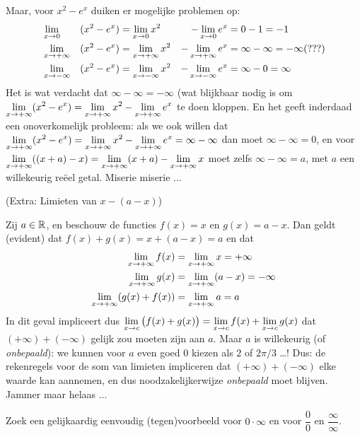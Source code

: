 \documentclass{ximera}
\begin{document}
\begin{example}
	Maar, voor $x^2 - e^x$ duiken er mogelijke problemen op:
	\begin{alignat*}{6}
		& \limx &(x^2-e^x)   & = \limx x^2   &- \limx e^x   & = 0 - 1 = -1 \\
		& \limxi &(x^2-e^x)  & = \limxi x^2  &- \limxi e^x  & = \infty - \infty = -\infty (???) \\
		& \limxmi &(x^2-e^x) & = \limxmi x^2 &- \limxmi e^x & = \infty - 0 = \infty \\
	\end{alignat*}
	Het is wat verdacht dat $\infty - \infty = -\infty$ (wat blijkbaar nodig is om $\limxi (x^2-e^x) = \limxi x^2  - \limxi e^x$ te doen kloppen.  En het geeft inderdaad een onoverkomelijk probleem: als we ook willen dat $\limxi (x^2  - e^x) = \limxi x^2  - \limxi e^x  = \infty - \infty$  dan moet $\infty - \infty = 0$, en voor $\limxi ((x+a) - x) = \limxi (x+a) - \limxi x$ moet zelfs $\infty - \infty = a$, met $a$ een willekeurig reëel getal. Miserie miserie ...  

\end{example}
\begin{example}(Extra: Limieten van $x - (a-x)$)
	
	Zij $a\in\mathbb{R}$, en beschouw de functies $f(x)=x$ en $g(x)=a-x$. Dan geldt (evident) dat $f(x)+g(x)=x+(a-x)=a$ en dat 
	\begin{align*}
	\limxi f(x) & = \limxi x = +\infty \\
	\limxi g(x) & = \limxi (a-x) = -\infty \\
	\limxi (g(x)+f(x)) & = \limxi a = a \\
	\end{align*}
	In dit geval impliceert dus $\limxc \big(f(x) +g(x)\big) = \limxc f(x) + \limxc g(x)$ dat $(+\infty) + (-\infty)$ gelijk zou moeten zijn aan $a$. Maar $a$ is willekeurig (of \textit{onbepaald}): we kunnen voor $a$ even goed $0$ kiezen als $2$ of $2\pi/3$ \dots! Dus: de rekenregels voor de som van limieten impliceren dat $(+\infty)+(-\infty)$ elke waarde kan aannemen, en dus noodzakelijkerwijze \textit{onbepaald} moet blijven. Jammer maar helaas ...
	
	
\end{example}

\begin{example}
	Zoek een gelijkaardig eenvoudig (tegen)voorbeeld voor $0\cdot\infty$ en voor $\dfrac00$ en $\dfrac\infty\infty$.
\end{example}
\end{document}
